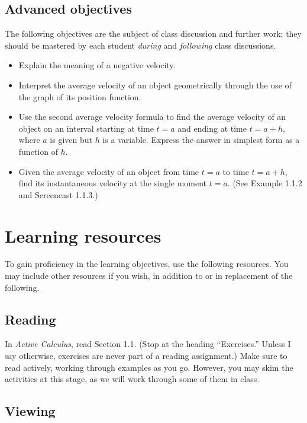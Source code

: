 \documentclass{ximera}
\begin{document}
\subsection*{Advanced objectives}

The following objectives are the subject of class discussion and
further work; they should be mastered by each student \emph{during}
and \emph{following} class discussions.\par

\begin{itemize}
\item Explain the meaning of a negative velocity.
\item Interpret the average velocity of an object geometrically
  through the use of the graph of its position function.
\item Use the second average velocity formula to find the average
  velocity of an object on an interval starting at time $t=a$ and
  ending at time $t=a+h$, where $a$ is given but $h$ is a
  variable. Express the answer in simplest form as a function of $h$.
\item Given the average velocity of an object from time $t=a$ to time $t=a+h$, find its
  instantaneous velocity at the single moment $t=a$. (See Example 1.1.2 and
  Screencast 1.1.3.)
\end{itemize}

\section*{Learning resources}
To gain proficiency in the learning objectives, use the following
resources. You may include other resources if you wish, in addition to
or in replacement of the following.

\subsection*{Reading}
In \emph{Active Calculus}, read Section 1.1. (Stop at the heading
``Exercises.'' Unless I say otherwise, exercises are never
part of a reading assignment.) Make sure to read actively, working
through examples as you go. However, you may skim the activities at
this stage, as we will work through some of them in class.\par

\subsection*{Viewing}
\end{document}
